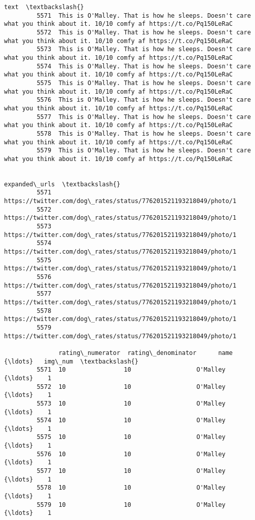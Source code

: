 \documentclass[11pt]{article}
\begin{document}
\begin{Verbatim}[commandchars=\\\{\}]
                                                                                                                                text  \textbackslash{}
         5571  This is O'Malley. That is how he sleeps. Doesn't care what you think about it. 10/10 comfy af https://t.co/Pq150LeRaC   
         5572  This is O'Malley. That is how he sleeps. Doesn't care what you think about it. 10/10 comfy af https://t.co/Pq150LeRaC   
         5573  This is O'Malley. That is how he sleeps. Doesn't care what you think about it. 10/10 comfy af https://t.co/Pq150LeRaC   
         5574  This is O'Malley. That is how he sleeps. Doesn't care what you think about it. 10/10 comfy af https://t.co/Pq150LeRaC   
         5575  This is O'Malley. That is how he sleeps. Doesn't care what you think about it. 10/10 comfy af https://t.co/Pq150LeRaC   
         5576  This is O'Malley. That is how he sleeps. Doesn't care what you think about it. 10/10 comfy af https://t.co/Pq150LeRaC   
         5577  This is O'Malley. That is how he sleeps. Doesn't care what you think about it. 10/10 comfy af https://t.co/Pq150LeRaC   
         5578  This is O'Malley. That is how he sleeps. Doesn't care what you think about it. 10/10 comfy af https://t.co/Pq150LeRaC   
         5579  This is O'Malley. That is how he sleeps. Doesn't care what you think about it. 10/10 comfy af https://t.co/Pq150LeRaC   
         
                                                                 expanded\_urls  \textbackslash{}
         5571  https://twitter.com/dog\_rates/status/776201521193218049/photo/1   
         5572  https://twitter.com/dog\_rates/status/776201521193218049/photo/1   
         5573  https://twitter.com/dog\_rates/status/776201521193218049/photo/1   
         5574  https://twitter.com/dog\_rates/status/776201521193218049/photo/1   
         5575  https://twitter.com/dog\_rates/status/776201521193218049/photo/1   
         5576  https://twitter.com/dog\_rates/status/776201521193218049/photo/1   
         5577  https://twitter.com/dog\_rates/status/776201521193218049/photo/1   
         5578  https://twitter.com/dog\_rates/status/776201521193218049/photo/1   
         5579  https://twitter.com/dog\_rates/status/776201521193218049/photo/1   
         
               rating\_numerator  rating\_denominator      name   {\ldots}   img\_num  \textbackslash{}
         5571  10                10                  O'Malley   {\ldots}    1        
         5572  10                10                  O'Malley   {\ldots}    1        
         5573  10                10                  O'Malley   {\ldots}    1        
         5574  10                10                  O'Malley   {\ldots}    1        
         5575  10                10                  O'Malley   {\ldots}    1        
         5576  10                10                  O'Malley   {\ldots}    1        
         5577  10                10                  O'Malley   {\ldots}    1        
         5578  10                10                  O'Malley   {\ldots}    1        
         5579  10                10                  O'Malley   {\ldots}    1        
         

\end{Verbatim}
\end{document}
